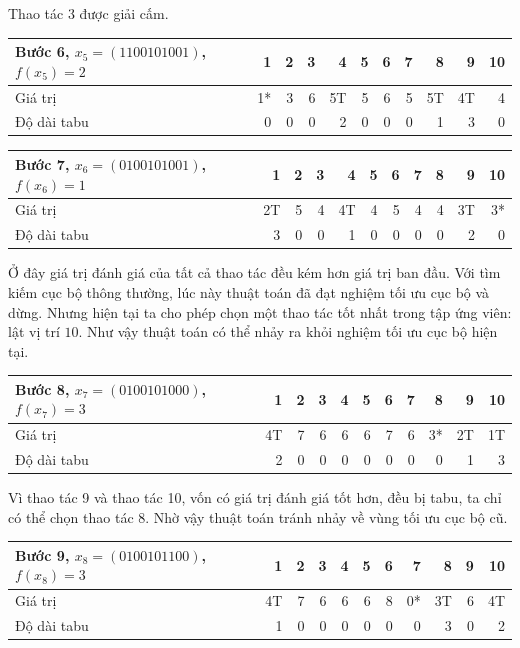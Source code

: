 \documentclass[11pt]{article}
\begin{document}
Thao tác 3 được giải cấm.

\begin{table}[htbp]
\centering
\scriptsize
\begin{tabular}{lrrrrrrrrrr}
\hline
Bước 6, \(x_5=(1100101001)\), \(f(x_5)=2\) & 1&2&3&4&5&6&7&8&9&10\\
\hline
Giá trị & 1*&3&6&5T&5&6&5&5T&4T&4\\
Độ dài tabu & 0&0&0&2&0&0&0&1&3&0\\
\hline
\end{tabular}
\end{table}

\begin{table}[htbp]
\centering
\scriptsize
\begin{tabular}{lrrrrrrrrrr}
\hline
Bước 7, \(x_6=(0100101001)\), \(f(x_6)=1\) & 1&2&3&4&5&6&7&8&9&10\\
\hline
Giá trị & 2T&5&4&4T&4&5&4&4&3T&3*\\
Độ dài tabu & 3&0&0&1&0&0&0&0&2&0\\
\hline
\end{tabular}
\end{table}

Ở đây giá trị đánh giá của tất cả thao tác đều kém hơn giá trị ban đầu. Với
tìm kiếm cục bộ thông thường, lúc này thuật toán đã đạt nghiệm tối ưu cục bộ
và dừng. Nhưng hiện tại ta cho phép chọn một thao tác tốt nhất trong tập ứng
viên: lật vị trí \(10\). Như vậy thuật toán có thể nhảy ra khỏi nghiệm tối ưu
cục bộ hiện tại.

\begin{table}[htbp]
\centering
\scriptsize
\begin{tabular}{lrrrrrrrrrr}
\hline
Bước 8, \(x_7=(0100101000)\), \(f(x_7)=3\) & 1&2&3&4&5&6&7&8&9&10\\
\hline
Giá trị & 4T&7&6&6&6&7&6&3*&2T&1T\\
Độ dài tabu & 2&0&0&0&0&0&0&0&1&3\\
\hline
\end{tabular}
\end{table}

Vì thao tác 9 và thao tác 10, vốn có giá trị đánh giá tốt hơn, đều bị tabu,
ta chỉ có thể chọn thao tác 8. Nhờ vậy thuật toán tránh nhảy về vùng tối ưu
cục bộ cũ.

\begin{table}[htbp]
\centering
\scriptsize
\begin{tabular}{lrrrrrrrrrr}
\hline
Bước 9, \(x_8=(0100101100)\), \(f(x_8)=3\) & 1&2&3&4&5&6&7&8&9&10\\
\hline
Giá trị & 4T&7&6&6&6&8&0*&3T&6&4T\\
Độ dài tabu & 1&0&0&0&0&0&0&3&0&2\\
\hline
\end{tabular}
\end{table}
\end{document}
